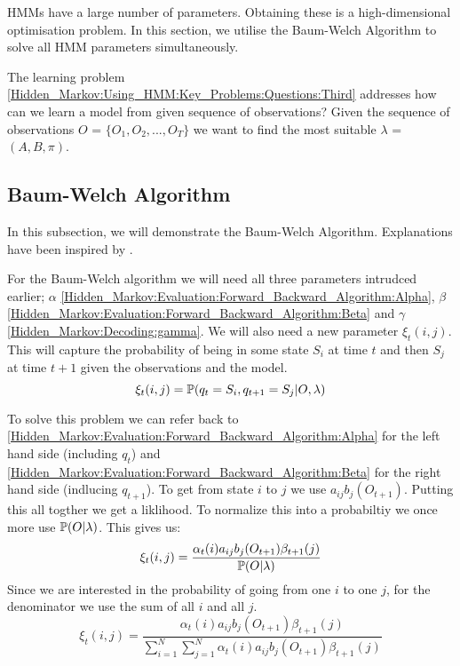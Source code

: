 HMMs have a large number of parameters. Obtaining these is a high-dimensional optimisation problem. In this section, we utilise the Baum-Welch Algorithm to solve all HMM parameters simultaneously.

The learning problem \ref{Hidden_Markov:Using_HMM:Key_Problems:Questions:Third} addresses how can we learn a model from given sequence of observations?  Given the sequence of observations $O$ = $\{O_1,O_2,...,O_T\}$ we want to find the most suitable $\lambda$ = $(A,B,\pi)$.


    \subsection{Baum-Welch Algorithm}
    \label{Hidden_Markov:Learning:Baum_Welch}

    In this subsection, we will demonstrate the Baum-Welch Algorithm. Explanations have been inspired by \cite{Baum}.

    For the Baum-Welch algorithm we will need all three parameters intrudced earlier; $\alpha$ \ref{Hidden_Markov:Evaluation:Forward_Backward_Algorithm:Alpha}, $\beta$ \ref{Hidden_Markov:Evaluation:Forward_Backward_Algorithm:Beta} and $\gamma$ \ref{Hidden_Markov:Decoding:gamma}. We will also need a new parameter $\xi_t(i,j)$. This will capture the probability of being in some state $S_i$ at time $t$ and then $S_j$ at time $t+1$ given the observations and the model. 
    \begin{equation}
        \xi_t(i,j) = \mathbb{P} (q_t = S_i, q_{t+1} = S_j | O, \lambda)
    \end{equation} 

    To solve this problem we can refer back to \ref{Hidden_Markov:Evaluation:Forward_Backward_Algorithm:Alpha} for the left hand side (including $q_t$) and \ref{Hidden_Markov:Evaluation:Forward_Backward_Algorithm:Beta} for the right hand side (indlucing $q_{t+1}$). To get from state $i$ to $j$ we use $a_{ij} b_j(O_{t+1})$. Putting this all togther we get a liklihood. To normalize this into a probabiltiy we once more use $\mathbb{P} (O|\lambda)$. This gives us:
    \begin{equation}
        \xi_t(i,j) = \dfrac{\alpha_t(i) a_{ij} b_j(O_{t+1}) \beta_{t+1}(j)}{\mathbb{P} (O|\lambda)}
    \end{equation}
    Since we are interested in the probability of going from one $i$ to one $j$, for the denominator we use the sum of all $i$ and all $j$. 
    \begin{equation}
        \xi_t(i,j) = \dfrac{\alpha_t(i) a_{ij} b_j(O_{t+1}) \beta_{t+1}(j)}{\sum_{i=1}^N \sum_{j=1}^N \alpha_t(i) a_{ij} b_j(O_{t+1}) \beta_{t+1}(j)}
    \end{equation}

